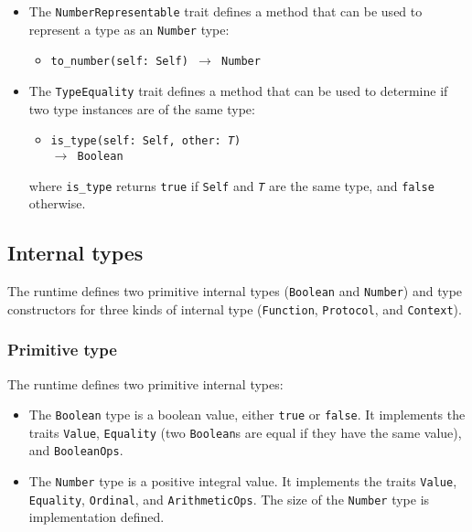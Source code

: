 \documentclass[10pt,twocolumn,a4paper]{article}
\newcommand{\code}[1]{\texttt{#1}}
\begin{document}
\begin{itemize}
  \item The \code{NumberRepresentable} trait defines a method that can be
    used to represent a type as an \code{Number} type:
    \begin{itemize}
      \item \texttt{to\_number(self: Self) $\rightarrow$ Number}
    \end{itemize}

  \item The \code{TypeEquality} trait defines a method that can be used to
    determine if two type instances are of the same type:
    \begin{itemize}
      \item \texttt{is\_type(self: Self, other: \emph{T})\\\hspace*{0.5cm}$\rightarrow$ Boolean}
    \end{itemize}
    where \code{is\_type} returns \code{true} if \code{Self} and \code{\emph{T}}
    are the same type, and \code{false} otherwise.
\end{itemize}

\subsection{Internal types}

The runtime defines two primitive internal types (\code{Boolean} and
\code{Number}) and type constructors for three kinds of internal type
(\code{Function}, \code{Protocol}, and \code{Context}).

\subsubsection{Primitive type}
\label{sec:internal-primitive}

The runtime defines two primitive internal types:

\begin{itemize}
  \item The \code{Boolean} type is a boolean value, either \code{true} or
    \code{false}.  It implements the traits \code{Value}, \code{Equality}
    (two \code{Boolean}s are equal if they have the same value), and
    \code{BooleanOps}.

  \item The \code{Number} type is a positive integral value. It implements the
    traits \code{Value}, \code{Equality}, \code{Ordinal}, and
    \code{ArithmeticOps}. The size of the \code{Number} type is implementation defined.
\end{itemize}
\end{document}
